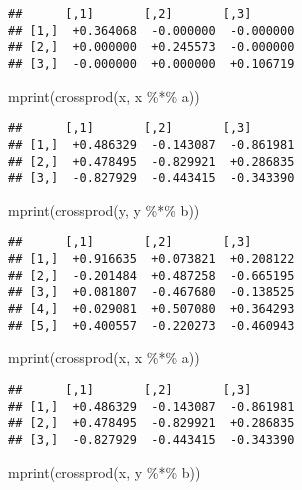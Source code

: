 \documentclass[
  12pt,
]{article}
\newenvironment{Shaded}{\begin{snugshade}}{\end{snugshade}}
\newcommand{\FunctionTok}[1]{\textcolor[rgb]{0.00,0.00,0.00}{#1}}
\newcommand{\NormalTok}[1]{#1}
\newcommand{\SpecialCharTok}[1]{\textcolor[rgb]{0.00,0.00,0.00}{#1}}
\begin{document}
\begin{verbatim}
##      [,1]       [,2]       [,3]      
## [1,]  +0.364068  -0.000000  -0.000000
## [2,]  +0.000000  +0.245573  -0.000000
## [3,]  -0.000000  +0.000000  +0.106719
\end{verbatim}

\begin{Shaded}
\begin{Highlighting}[]
\FunctionTok{mprint}\NormalTok{(}\FunctionTok{crossprod}\NormalTok{(x, x }\SpecialCharTok{\%*\%}\NormalTok{ a))}
\end{Highlighting}
\end{Shaded}

\begin{verbatim}
##      [,1]       [,2]       [,3]      
## [1,]  +0.486329  -0.143087  -0.861981
## [2,]  +0.478495  -0.829921  +0.286835
## [3,]  -0.827929  -0.443415  -0.343390
\end{verbatim}

\begin{Shaded}
\begin{Highlighting}[]
\FunctionTok{mprint}\NormalTok{(}\FunctionTok{crossprod}\NormalTok{(y, y }\SpecialCharTok{\%*\%}\NormalTok{ b))}
\end{Highlighting}
\end{Shaded}

\begin{verbatim}
##      [,1]       [,2]       [,3]      
## [1,]  +0.916635  +0.073821  +0.208122
## [2,]  -0.201484  +0.487258  -0.665195
## [3,]  +0.081807  -0.467680  -0.138525
## [4,]  +0.029081  +0.507080  +0.364293
## [5,]  +0.400557  -0.220273  -0.460943
\end{verbatim}

\begin{Shaded}
\begin{Highlighting}[]
\FunctionTok{mprint}\NormalTok{(}\FunctionTok{crossprod}\NormalTok{(x, x }\SpecialCharTok{\%*\%}\NormalTok{ a))}
\end{Highlighting}
\end{Shaded}

\begin{verbatim}
##      [,1]       [,2]       [,3]      
## [1,]  +0.486329  -0.143087  -0.861981
## [2,]  +0.478495  -0.829921  +0.286835
## [3,]  -0.827929  -0.443415  -0.343390
\end{verbatim}

\begin{Shaded}
\begin{Highlighting}[]
\FunctionTok{mprint}\NormalTok{(}\FunctionTok{crossprod}\NormalTok{(x, y }\SpecialCharTok{\%*\%}\NormalTok{ b))}
\end{Highlighting}
\end{Shaded}
\end{document}
